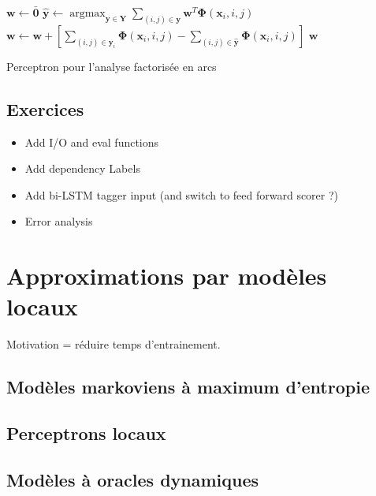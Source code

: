 \documentclass[11pt,openany]{book}
\begin{document}
\begin{algorithm}[htbp]
\begin{algorithmic}[1]
\State $\mathbf{w} \gets \bar{\mathbf{0}}$
\State
$\hat{\mathbf{y}} \gets \mathop{\text{argmax}}_{\mathbf{y}\in
  \mathbf{Y}} 
\sum_{(i,j) \in \mathbf{y}} \mathbf{w}^T \boldsymbol\Phi(\mathbf{x}_i,i,j)$
     \State $\mathbf{w} \gets  \mathbf{w} +
     \left[ \sum_{(i,j) \in \mathbf{y}_i} \boldsymbol\Phi(\mathbf{x}_i,i,j) 
       - \sum_{(i,j) \in
         \hat{\mathbf{y}}}\boldsymbol\Phi(\mathbf{x}_i,i,j)   \right]$ 
\EndIf
\EndFor
\EndFor
\State \Return $\mathbf{w}$
\EndFunction
\end{algorithmic}
\caption{\label{perceptron-eisner}Perceptron pour l'analyse factorisée
en arcs}
\end{algorithm}



\section{Exercices}
\begin{itemize}
\item Add I/O and eval functions
\item Add dependency Labels
\item Add bi-LSTM tagger input (and switch to feed forward scorer ?)
\item Error analysis
\end{itemize}




\chapter{Approximations par modèles locaux}

Motivation = réduire temps d'entrainement.

\section{Modèles markoviens à maximum d'entropie}
\section{Perceptrons locaux}
\section{Modèles à oracles dynamiques}
\end{document}
